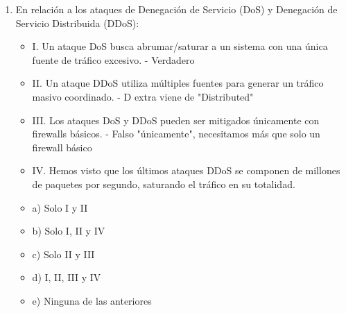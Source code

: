 \documentclass[a4paper]{article}
\begin{document}
\begin{enumerate}
    \item En relación a los ataques de Denegación de Servicio (DoS) y Denegación de Servicio Distribuida (DDoS):
    \begin{itemize}
        \item I. Un ataque DoS busca abrumar/saturar a un sistema con una única fuente de tráfico excesivo. - Verdadero
        \item II. Un ataque DDoS utiliza múltiples fuentes para generar un tráfico masivo coordinado. - D extra viene de "Distributed"
        \item III. Los ataques DoS y DDoS pueden ser mitigados únicamente con firewalls básicos. - Falso "únicamente", necesitamos más que solo un firewall básico
        \item IV. Hemos visto que los últimos ataques DDoS se componen de millones de paquetes por segundo, saturando el tráfico en su totalidad.
    \end{itemize}
    \begin{itemize}
        \item a) Solo I y II
        \item b) Solo I, II y IV
        \item c) Solo II y III
        \item d) I, II, III y IV
        \item e) Ninguna de las anteriores
    \end{itemize}
    

\end{enumerate}
\end{document}
